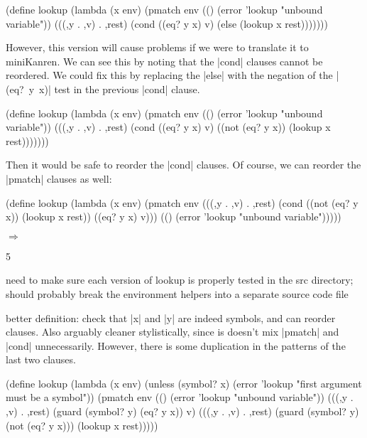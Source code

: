 \begin{schemedisplay}
(define lookup
  (lambda (x env)
    (pmatch env
      (() (error 'lookup "unbound variable"))
      (((,y . ,v) . ,rest)
       (cond
         ((eq? y x) v)
         (else (lookup x rest)))))))
\end{schemedisplay}

However, this version will cause problems if we were to translate it
to miniKanren.  We can see this by noting that the \scheme|cond|
clauses cannot be reordered.  We could fix this by replacing the
\scheme|else| with the negation of the \mbox{\scheme|(eq? y x)|} test
in the previous \scheme|cond| clause.

\begin{schemedisplay}
(define lookup
  (lambda (x env)
    (pmatch env
      (() (error 'lookup "unbound variable"))
      (((,y . ,v) . ,rest)
       (cond
         ((eq? y x) v)
         ((not (eq? y x)) (lookup x rest)))))))
\end{schemedisplay}

Then it would be safe to reorder the \scheme|cond| clauses.  Of course, we can
reorder the \scheme|pmatch| clauses as well:

\begin{schemedisplay}
(define lookup
  (lambda (x env)
    (pmatch env
      (((,y . ,v) . ,rest)
       (cond
         ((not (eq? y x)) (lookup x rest))
         ((eq? y x) v)))
      (() (error 'lookup "unbound variable")))))
\end{schemedisplay}

\noindent{} $\Rightarrow$
\begin{schemeresponsebox}5\end{schemeresponsebox}

need to make sure each version of lookup is properly tested in the src directory;
should probably break the environment helpers into a separate source code file


better definition: check that \scheme|x| and \scheme|y| are indeed
symbols, and can reorder clauses.  Also arguably cleaner
stylistically, since is doesn't mix \scheme|pmatch| and \scheme|cond|
unnecessarily.  However, there is some duplication in the patterns of
the last two clauses.

\begin{schemedisplay}
(define lookup
  (lambda (x env)
    (unless (symbol? x)
      (error 'lookup "first argument must be a symbol"))
    (pmatch env
      (() (error 'lookup "unbound variable"))
      (((,y . ,v) . ,rest) (guard (symbol? y) (eq? y x))
       v)
      (((,y . ,v) . ,rest) (guard (symbol? y) (not (eq? y x)))
       (lookup x rest)))))
\end{schemedisplay}

